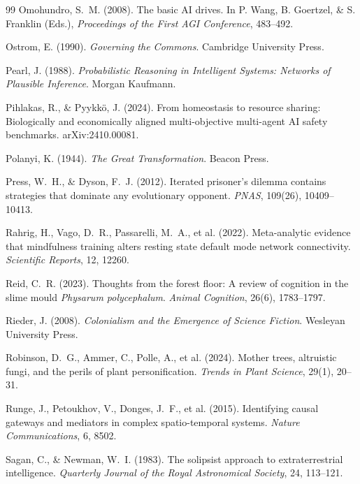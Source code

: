 \documentclass[11pt,twocolumn]{article}
\begin{document}
\begin{thebibliography}{99}
 Omohundro, S.~M. (2008). The basic AI drives. In P. Wang, B. Goertzel, \& S. Franklin (Eds.), \emph{Proceedings of the First AGI Conference}, 483--492.

 Ostrom, E. (1990). \emph{Governing the Commons}. Cambridge University Press.

 Pearl, J. (1988). \emph{Probabilistic Reasoning in Intelligent Systems: Networks of Plausible Inference}. Morgan Kaufmann.

 Pihlakas, R., \& Pyykkö, J. (2024). From homeostasis to resource sharing: Biologically and economically aligned multi-objective multi-agent AI safety benchmarks. arXiv:2410.00081.

 Polanyi, K. (1944). \emph{The Great Transformation}. Beacon Press.

 Press, W.~H., \& Dyson, F.~J. (2012). Iterated prisoner's dilemma contains strategies that dominate any evolutionary opponent. \emph{PNAS}, 109(26), 10409--10413.

 Rahrig, H., Vago, D.~R., Passarelli, M.~A., et al. (2022). Meta-analytic evidence that mindfulness training alters resting state default mode network connectivity. \emph{Scientific Reports}, 12, 12260.

 Reid, C.~R. (2023). Thoughts from the forest floor: A review of cognition in the slime mould \emph{Physarum polycephalum}. \emph{Animal Cognition}, 26(6), 1783--1797.

 Rieder, J. (2008). \emph{Colonialism and the Emergence of Science Fiction}. Wesleyan University Press.

 Robinson, D.~G., Ammer, C., Polle, A., et al. (2024). Mother trees, altruistic fungi, and the perils of plant personification. \emph{Trends in Plant Science}, 29(1), 20--31.

 Runge, J., Petoukhov, V., Donges, J.~F., et al. (2015). Identifying causal gateways and mediators in complex spatio-temporal systems. \emph{Nature Communications}, 6, 8502.

 Sagan, C., \& Newman, W.~I. (1983). The solipsist approach to extraterrestrial intelligence. \emph{Quarterly Journal of the Royal Astronomical Society}, 24, 113--121.


\end{thebibliography}
\end{document}
